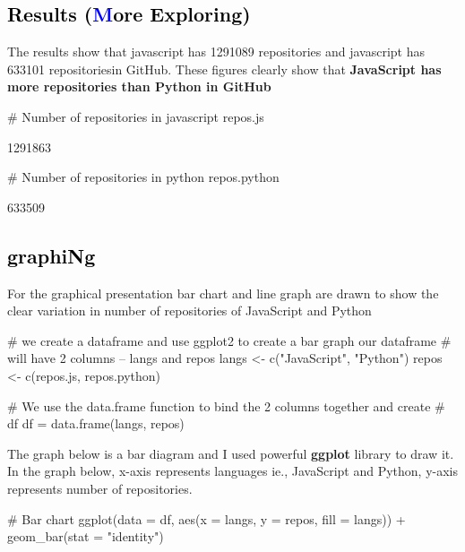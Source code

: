 \documentclass{article}\usepackage[]{graphicx}\usepackage[]{color}
\begin{document}
{\subsection*{\Large\textcolor{black}{Results (\textcolor{blue}{M}\textcolor{black}{ore Exploring)}}}
The results show that javascript has 1291089 repositories and javascript has 633101 repositoriesin GitHub. These figures clearly show that \textbf{JavaScript has more repositories than Python in GitHub}

\begin{Schunk}
\begin{Sinput}
# Number of repositories in javascript
repos.js
\end{Sinput}
\begin{Soutput}
[1] 1291863
\end{Soutput}
\begin{Sinput}
# Number of repositories in python
repos.python
\end{Sinput}
\begin{Soutput}
[1] 633509
\end{Soutput}
\end{Schunk}

\subsection*{\Large\textcolor{black}{graphiNg}}
For the graphical presentation bar chart and line graph are drawn to show the clear variation in number of repositories of JavaScript and Python

\begin{Schunk}
\begin{Sinput}
# we create a dataframe and use ggplot2 to create a bar graph our dataframe
# will have 2 columns -- langs and repos
langs <- c("JavaScript", "Python")
repos <- c(repos.js, repos.python)

# We use the data.frame function to bind the 2 columns together and create
# df
df = data.frame(langs, repos)
\end{Sinput}
\end{Schunk}

The graph below is a bar diagram and I used powerful \textbf{ggplot} library to draw it. In the graph below, x-axis represents languages ie., JavaScript and Python, y-axis represents number of repositories.  

\begin{Schunk}
\begin{Sinput}
# Bar chart
ggplot(data = df, aes(x = langs, y = repos, fill = langs)) + geom_bar(stat = "identity")
\end{Sinput}


\end{Schunk}}
\end{document}
